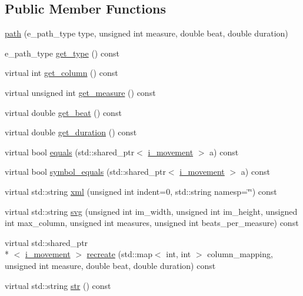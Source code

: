 \subsection*{Public Member Functions}
\begin{DoxyCompactItemize}
\item 
\hyperlink{classmae_1_1fl_1_1laban_1_1path_a68f460107949210973195837c9f1b33c}{path} (e\-\_\-path\-\_\-type type, unsigned int measure, double beat, double duration)
\item 
e\-\_\-path\-\_\-type \hyperlink{classmae_1_1fl_1_1laban_1_1path_ac9698b90c1d5dae5d2fbc09b0db79c8d}{get\-\_\-type} () const 
\item 
virtual int \hyperlink{classmae_1_1fl_1_1laban_1_1path_a6a842cc38fccadb4d9deca546fce3e63}{get\-\_\-column} () const 
\item 
virtual unsigned int \hyperlink{classmae_1_1fl_1_1laban_1_1path_a2f355b941253903aff22add92e00124f}{get\-\_\-measure} () const 
\item 
virtual double \hyperlink{classmae_1_1fl_1_1laban_1_1path_ad7f035766edfa9f6f9f2037c26fc3309}{get\-\_\-beat} () const 
\item 
virtual double \hyperlink{classmae_1_1fl_1_1laban_1_1path_a4f45bad78535e21149bdec9a48067113}{get\-\_\-duration} () const 
\item 
virtual bool \hyperlink{classmae_1_1fl_1_1laban_1_1path_ade22858a457d91a3faa2a3eee14d66be}{equals} (std\-::shared\-\_\-ptr$<$ \hyperlink{classmae_1_1fl_1_1laban_1_1i__movement}{i\-\_\-movement} $>$ a) const 
\item 
virtual bool \hyperlink{classmae_1_1fl_1_1laban_1_1path_a209b3fe2e8df9d2c98999684bed7f496}{symbol\-\_\-equals} (std\-::shared\-\_\-ptr$<$ \hyperlink{classmae_1_1fl_1_1laban_1_1i__movement}{i\-\_\-movement} $>$ a) const 
\item 
virtual std\-::string \hyperlink{classmae_1_1fl_1_1laban_1_1path_a20f5c424a4fc9036a66a7a6f806940f4}{xml} (unsigned int indent=0, std\-::string namesp=\char`\"{}\char`\"{}) const 
\item 
virtual std\-::string \hyperlink{classmae_1_1fl_1_1laban_1_1path_a5503bfcfc2a9461b48a3bd2232918d88}{svg} (unsigned int im\-\_\-width, unsigned int im\-\_\-height, unsigned int max\-\_\-column, unsigned int measures, unsigned int beats\-\_\-per\-\_\-measure) const 
\item 
virtual std\-::shared\-\_\-ptr\\*
$<$ \hyperlink{classmae_1_1fl_1_1laban_1_1i__movement}{i\-\_\-movement} $>$ \hyperlink{classmae_1_1fl_1_1laban_1_1path_a3454902829d0ae3a3e958d59cce9cd47}{recreate} (std\-::map$<$ int, int $>$ column\-\_\-mapping, unsigned int measure, double beat, double duration) const 
\item 
virtual std\-::string \hyperlink{classmae_1_1fl_1_1laban_1_1path_a4824d4b55eac3e255a64537be864fc24}{str} () const 
\end{DoxyCompactItemize}
